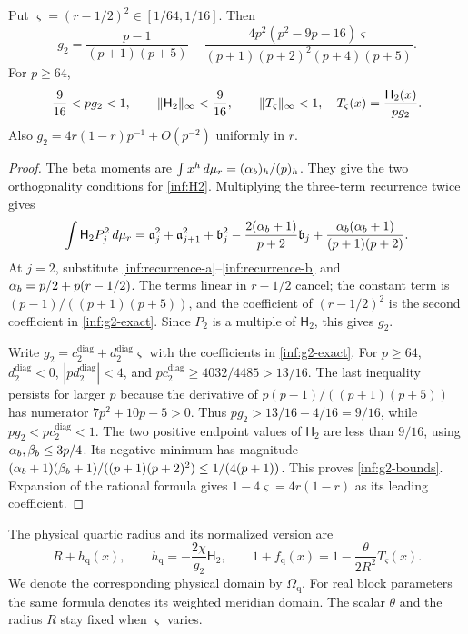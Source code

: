 \begin{lemma}\label{inf:quartic-normalization}
Put $\varsigma=(r-1/2)^2\in[1/64,1/16]$. Then
\begin{equation}\label{inf:g2-exact}
 g_2=\frac{p-1}{(p+1)(p+5)}
 -\frac{4p^2(p^2-9p-16)\varsigma}{(p+1)(p+2)^2(p+4)(p+5)}.
\end{equation}
For $p\ge64$,
\begin{equation}\label{inf:g2-bounds}
 \frac9{16}<pg_2<1,\qquad
 \lVert \mathsf H_2\rVert_\infty<\frac9{16},\qquad
 \lVert T_\varsigma\rVert_\infty<1,\quad T_\varsigma(x)=\frac{\mathsf H_2(x)}{pg_2}.
\end{equation}
Also $g_2=4r(1-r)p^{-1}+O(p^{-2})$ uniformly in $r$.
\end{lemma}
\begin{proof}
The beta moments are $\int x^h\,d\mu_r=(\alpha_b)_h/(p)_h$.
They give the two orthogonality conditions for \eqref{inf:H2}.
Multiplying the three-term recurrence twice gives
\[
 \int \mathsf H_2P_j^2\,d\mu_r
 =\mathfrak a_j^2+\mathfrak a_{j+1}^2+\mathfrak b_j^2
 -\frac{2(\alpha_b+1)}{p+2}\mathfrak b_j
 +\frac{\alpha_b(\alpha_b+1)}{(p+1)(p+2)}.
\]
At $j=2$, substitute \eqref{inf:recurrence-a}--\eqref{inf:recurrence-b}
and $\alpha_b=p/2+p(r-1/2)$. The terms linear in $r-1/2$ cancel;
the constant term is $(p-1)/((p+1)(p+5))$, and the coefficient of
$(r-1/2)^2$ is the second coefficient in \eqref{inf:g2-exact}.
Since $P_2$ is a multiple of $\mathsf H_2$, this gives $g_2$.

Write $g_2=c_2^{\mathrm{diag}}+d_2^{\mathrm{diag}}\varsigma$
with the coefficients in \eqref{inf:g2-exact}. For $p\ge64$,
$d_2^{\mathrm{diag}}<0$, $|pd_2^{\mathrm{diag}}|<4$, and
$pc_2^{\mathrm{diag}}\ge4032/4485>13/16$.
The last inequality persists for larger $p$ because the derivative of
$p(p-1)/((p+1)(p+5))$ has numerator $7p^2+10p-5>0$.
Thus $pg_2>13/16-4/16=9/16$, while $pg_2<pc_2^{\mathrm{diag}}<1$.
The two positive endpoint values of $\mathsf H_2$ are less than $9/16$,
using $\alpha_b,\beta_b\le3p/4$. Its negative minimum has magnitude
$(\alpha_b+1)(\beta_b+1)/((p+1)(p+2)^2)\le1/(4(p+1))$.
This proves \eqref{inf:g2-bounds}. Expansion of the rational formula
gives $1-4\varsigma=4r(1-r)$ as its leading coefficient.
\end{proof}

The physical quartic radius and its normalized version are
\begin{equation}\label{inf:quartic-domain}
 R+h_{\mathrm q}(x),\qquad
 h_{\mathrm q}=-\frac{2\chi}{g_2}\mathsf H_2,\qquad
 1+f_{\mathrm q}(x)=1-\frac{\theta}{2R^2}T_\varsigma(x).
\end{equation}
We denote the corresponding physical domain by $\Omega_{\mathrm q}$.
For real block parameters the same formula denotes its weighted
meridian domain. The scalar $\theta$ and the radius $R$ stay fixed
when $\varsigma$ varies.

